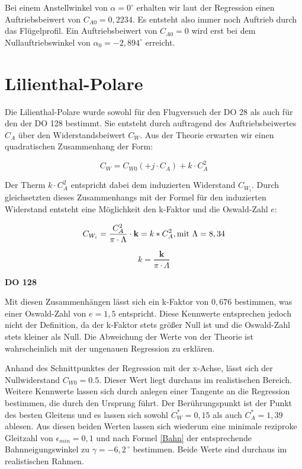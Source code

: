 Bei einem Anstellwinkel von $\alpha = 0^{\circ}$ erhalten wir laut der Regression einen Auftriebsbeiwert von $C_{A0} = 0,2234$. Es entsteht also immer noch Auftrieb durch das Flügelprofil. 
Ein Auftriebsbeiwert von $C_{A0} = 0$ wird erst bei dem Nullauftriebswinkel von $\alpha_0 = -2,894^{\circ}$ erreicht.

\section{Lilienthal-Polare}
Die Lilienthal-Polare wurde sowohl für den Flugversuch der DO 28 als auch für den der DO 128 bestimmt. Sie entsteht durch auftragend des Auftriebsbeiwertes $C_A$ über den Widerstandsbeiwert $C_W$. 
Aus der Theorie erwarten wir einen quadratischen Zusammenhang der Form:

\begin{equation}
C_W = C_{W0} (+ j \cdot C_A) + k \cdot C_{A}^2
\end{equation}

Der Therm $k \cdot C_{A}^2$ entspricht dabei dem induzierten Widerstand $C_{W_i}$. Durch gleichsetzten dieses Zusammenhangs mit der Formel für den induzierten Widerstand entsteht eine Möglichkeit den k-Faktor und die Oswald-Zahl $e$:

\begin{equation}
C_{W_{i}}=\frac{C_A^2}{\pi \cdot \Lambda}\cdot \textbf{k}=k*C_A^2, \\ \mathrm{mit} \ \Lambda=8,34 
\label{eq:C_W_i}
\end{equation}

\begin{equation}
k = \frac{\textbf{k}}{\pi \cdot \Lambda}
\end{equation}

\textbf{DO 128}

Mit diesen Zusammenhängen lässt sich ein k-Faktor von $0,676$ bestimmen, was einer Oswald-Zahl von $e = 1,5$ entspricht. Diese Kennwerte entsprechen jedoch nicht der Definition, da der k-Faktor stets größer Null ist und die Oswald-Zahl stets kleiner als Null. Die Abweichung der Werte von der Theorie ist wahrscheinlich mit der ungenauen Regression zu erklären.

Anhand des Schnittpunktes der Regression mit der x-Achse, lässt sich der Nullwiderstand $C_{W0} = 0.5$. Dieser Wert liegt durchaus im realistischen Bereich. Weitere Kennwerte lassen sich durch anlegen einer Tangente an die Regression bestimmen, die durch den Ursprung führt. Der Berührungspunkt ist der Punkt des besten Gleitens und es lassen sich sowohl $C_W^* = 0,15$ als auch $C_A^* = 1,39$ ablesen. Aus diesen beiden Werten lassen sich wiederum eine minimale reziproke Gleitzahl von $\epsilon_{min} = 0,1$ und nach Formel \ref{Bahn} der entsprechende Bahnneigungswinkel zu $\gamma=-6,2^{\ \circ}$ bestimmen. Beide Werte sind durchaus im realistischen Rahmen.


